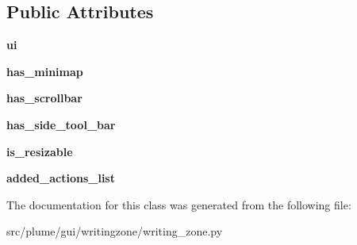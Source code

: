 \subsection*{Public Attributes}
\begin{DoxyCompactItemize}
\item 
{\bfseries ui}\hypertarget{classplume-creator_1_1src_1_1plume_1_1gui_1_1writingzone_1_1writing__zone_1_1_writing_zone_a727976cbef74d63feeb55267e54cc349}{}\label{classplume-creator_1_1src_1_1plume_1_1gui_1_1writingzone_1_1writing__zone_1_1_writing_zone_a727976cbef74d63feeb55267e54cc349}

\item 
{\bfseries has\+\_\+minimap}\hypertarget{classplume-creator_1_1src_1_1plume_1_1gui_1_1writingzone_1_1writing__zone_1_1_writing_zone_abc38fc6b609d34d23feb934c0934e802}{}\label{classplume-creator_1_1src_1_1plume_1_1gui_1_1writingzone_1_1writing__zone_1_1_writing_zone_abc38fc6b609d34d23feb934c0934e802}

\item 
{\bfseries has\+\_\+scrollbar}\hypertarget{classplume-creator_1_1src_1_1plume_1_1gui_1_1writingzone_1_1writing__zone_1_1_writing_zone_a3e6a7d2543cd81c5881760ff0afe5e01}{}\label{classplume-creator_1_1src_1_1plume_1_1gui_1_1writingzone_1_1writing__zone_1_1_writing_zone_a3e6a7d2543cd81c5881760ff0afe5e01}

\item 
{\bfseries has\+\_\+side\+\_\+tool\+\_\+bar}\hypertarget{classplume-creator_1_1src_1_1plume_1_1gui_1_1writingzone_1_1writing__zone_1_1_writing_zone_a20d021b23b8fcdbcf5d41aeeb6d07ed2}{}\label{classplume-creator_1_1src_1_1plume_1_1gui_1_1writingzone_1_1writing__zone_1_1_writing_zone_a20d021b23b8fcdbcf5d41aeeb6d07ed2}

\item 
{\bfseries is\+\_\+resizable}\hypertarget{classplume-creator_1_1src_1_1plume_1_1gui_1_1writingzone_1_1writing__zone_1_1_writing_zone_ac70b3d5d29551a46d20f2d4be47ba90a}{}\label{classplume-creator_1_1src_1_1plume_1_1gui_1_1writingzone_1_1writing__zone_1_1_writing_zone_ac70b3d5d29551a46d20f2d4be47ba90a}

\item 
{\bfseries added\+\_\+actions\+\_\+list}\hypertarget{classplume-creator_1_1src_1_1plume_1_1gui_1_1writingzone_1_1writing__zone_1_1_writing_zone_a66c27bb91324b69a893c5a31140e482a}{}\label{classplume-creator_1_1src_1_1plume_1_1gui_1_1writingzone_1_1writing__zone_1_1_writing_zone_a66c27bb91324b69a893c5a31140e482a}

\end{DoxyCompactItemize}


The documentation for this class was generated from the following file\+:\begin{DoxyCompactItemize}
\item 
src/plume/gui/writingzone/writing\+\_\+zone.\+py\end{DoxyCompactItemize}
